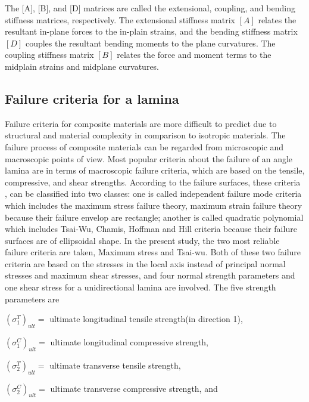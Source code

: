 The [A], [B], and [D] matrices are called the extensional, coupling, and bending stiffness matrices,
respectively. The extensional stiffness matrix $[A]$ relates the resultant in-plane forces to the
in-plain strains, and the bending stiffness matrix $[D]$ couples the resultant bending moments to
the plane curvatures.  The coupling stiffness matrix $[B]$ relates the force and moment terms to the
midplain strains and midplane curvatures.

\subsection{Failure criteria for a lamina}

Failure criteria for composite materials are more difficult to predict due to
structural and material complexity in comparison to isotropic materials. The
failure process of composite materials can be regarded from microscopic and
macroscopic points of view. Most popular criteria about the failure of an angle
lamina are in terms of macroscopic failure criteria, which are based on the
tensile, compressive, and shear strengths. According to the failure surfaces,
these criteria
\cite{massard1984computer,reddy1987first,fang1993design,soeiro1994multilevel,pelletier2006multi,jadhav2007parametric,omkar2008artificial,choudhury2019failure},
can be classified into two classes: one is called independent failure mode
criteria which includes the maximum stress failure
theory\cite{watkins1987multicriteria}, maximum strain failure theory because
their failure envelop are rectangle; another is called quadratic polynomial
which includes Tsai-Wu\cite{martin1987optimum,soares1995discrete}, Chamis,
Hoffman and Hill criteria because their failure surfaces are of ellipsoidal
shape. In the present study, the two most reliable failure criteria are taken,
Maximum stress and Tsai-wu.  Both of these two failure criteria are based on
the stresses in the local axis instead of principal normal stresses and maximum
shear stresses, and four normal strength parameters and one shear stress for a
unidirectional lamina are involved. The five strength parameters are

$(\sigma _1^{T})_{ult}= $ ultimate longitudinal tensile strength(in direction 1),

$(\sigma _1^{C})_{ult}= $ ultimate longitudinal compressive strength,

$(\sigma _2^{T})_{ult}= $ ultimate transverse tensile strength,

$(\sigma _2^{C})_{ult}= $ ultimate transverse compressive strength, and

